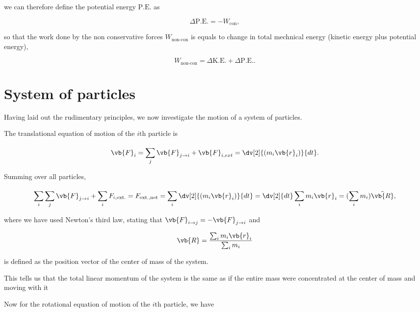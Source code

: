 \documentclass[a4paper,12pt]{report}
\begin{document}
we can therefore define the potential energy \(\text{P.E.} \) as 

\begin{equation}
	\Delta \text{P.E.}  = - W_{\text{con} }, 
\end{equation}

so that the work done by the non conservative forces \(W_{\text{non-con} } \) is equals to change in total mechnical energy (kinetic energy plus potential energy), 

\begin{equation}
	W_{\text{non-con} } = \Delta \text{K.E.}  + \Delta \text{P.E.}.  
\end{equation}


\section{System of particles}
Having laid out the rudimentary principles, we now investigate the motion of a system of particles.

The translational equation of motion of the \(i \text{th} \) particle is 

\begin{equation}
	\vb{F} _{i} = \sum_{j}^{} \vb{F} _{j \rightarrow i} + \vb{F} _{i, ext} = \dv[2]{(m_{i} \vb{r} _{i} )}{dt}     .
\end{equation}
 
Summing over all particles,

\begin{equation}
	\sum_{i}^{} \sum_{j}^{} \vb{F} _{j \rightarrow i} + \sum_{i}^{} F_{i,\text{ext.} } = F_{\text{ext.,net} } =  \sum_{i}^{} \dv[2]{(m_{i} \vb{r} _{i} )}{dt} = \dv[2]{dt} \sum_{i}^{} m_{i} \vb{r} _{i} =  (\sum_{i}^{} m_{i} ) \ddot{\vb{R} },
\end{equation}

where we have used Newton's third law, stating that \(\vb{F} _{i \rightarrow j} = -\vb{F} _{j \rightarrow i} \) and  

\begin{equation}
	\vb{R} = \frac{\sum_{i}^{} m_{i} \vb{r} _{i} }{\sum_{i}^{} m_{i}  } 
\end{equation}

is defined as the position vector of the center of mass of the system.

This tells us that the total linear momentum of the system is the same as if the entire mass were concentrated at the center of mass and moving with it

Now for the rotational equation of motion of the \(i \text{th} \) particle, we have
\end{document}

